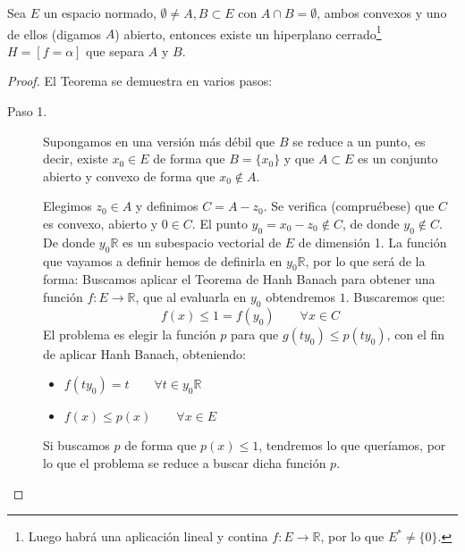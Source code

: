 \begin{teo}
    Sea $E$ un espacio normado, $\emptyset \neq A,B\subset E$ con $A\cap B = \emptyset $, ambos convexos y uno de ellos (digamos $A$) abierto, entonces existe un hiperplano cerrado\footnote{Luego habrá una aplicación lineal y contina $f:E\to \mathbb{R}$, por lo que $E^\ast \neq \{0\}$.} $H = [f=\alpha]$ que separa $A$ y $B$.
    \begin{proof}
        El Teorema se demuestra en varios pasos:
        \begin{description}
            \item [Paso 1.] Supongamos en una versión más débil que $B$ se reduce a un punto, es decir, existe $x_0\in E$ de forma que $B = \{x_0\}$ y que $A\subset E$ es un conjunto abierto y convexo de forma que $x_0 \notin A$.

                Elegimos $z_0\in A$ y definimos $C = A-z_0$. Se verifica (compruébese) que $C$ es convexo, abierto y $0\in C$. %
                El punto $y_0 = x_ 0 - z_0\notin C$, de donde $y_0 \notin C$. De donde $y_0\mathbb{R}$ es un subespacio vectorial de $E$ de dimensión 1. La función que vayamos a definir hemos de definirla en $y_0\mathbb{R}$, por lo que será de la forma:
                Buscamos aplicar el Teorema de Hanh Banach para obtener una función $f:E\to \mathbb{R}$, que al evaluarla en $y_0$ obtendremos $1$. Buscaremos que:
                \begin{equation*}
                    f(x) \leq 1 = f(y_0) \qquad \forall x\in C
                \end{equation*}
                El problema es elegir la función $p$ para que $g(ty_0) \leq p(ty_0)$, con el fin de aplicar Hanh Banach, obteniendo:
                \begin{itemize}
                    \item $f(ty_0) = t \qquad \forall t\in y_0\mathbb{R}$
                    \item $f(x) \leq p(x) \qquad \forall x\in E$
                \end{itemize}
                Si buscamos $p$ de forma que $p(x)\leq 1$, tendremos lo que queríamos, por lo que el problema se reduce a buscar dicha función $p$.
        \end{description}
    \end{proof}
\end{teo}
